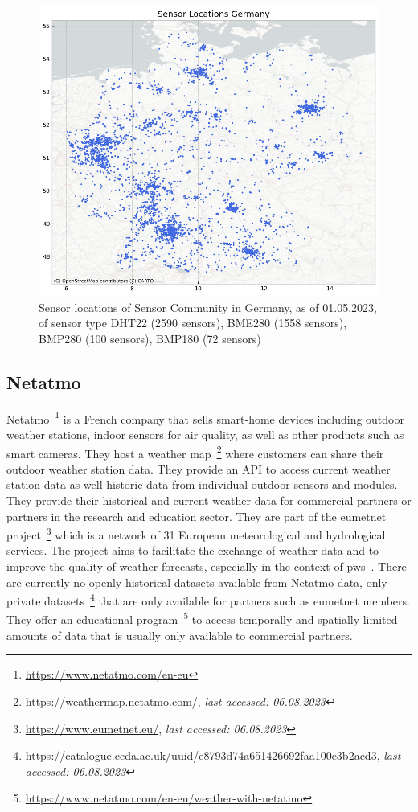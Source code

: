 \begin{figure}[ht]
    \centering
    \includegraphics[width=1\textwidth]{images/sc_sensor_locations_germany.png}
    \caption{Sensor locations of Sensor Community in Germany, as of 01.05.2023, of sensor type DHT22 (2590 sensors), BME280 (1558 sensors), BMP280 (100 sensors), BMP180 (72 sensors)}
    \label{fig:sensor community sensor locations germany}
\end{figure}

\subsection{Netatmo}

Netatmo~\footnote{\url{https://www.netatmo.com/en-eu}} is a French company that sells smart-home devices including outdoor weather stations, indoor sensors for air quality, as well as other products such as smart cameras. They host a weather map~\footnote{\url{https://weathermap.netatmo.com/}, \textit{last accessed: 06.08.2023}} where customers can share their outdoor weather station data. They provide an API to access current weather station data as well historic data from individual outdoor sensors and modules.
They provide their historical and current weather data for commercial partners or partners in the research and education sector. They are part of the \gls{eumetnet} project~\footnote{\url{https://www.eumetnet.eu/}, \textit{last accessed: 06.08.2023}} which is a network of 31 European meteorological and hydrological services. The project aims to facilitate the exchange of weather data and to improve the quality of weather forecasts, especially in the context of \gls{pws}~\cite{hahn2022observations}. There are currently no openly historical datasets available from Netatmo data, only private datasets~\footnote{\url{https://catalogue.ceda.ac.uk/uuid/e8793d74a651426692faa100e3b2acd3}, \textit{last accessed: 06.08.2023}} that are only available for partners such as \gls{eumetnet} members. They offer an educational program~\footnote{\url{https://www.netatmo.com/en-eu/weather-with-netatmo}} to access temporally and spatially limited amounts of data that is usually only available to commercial partners.

